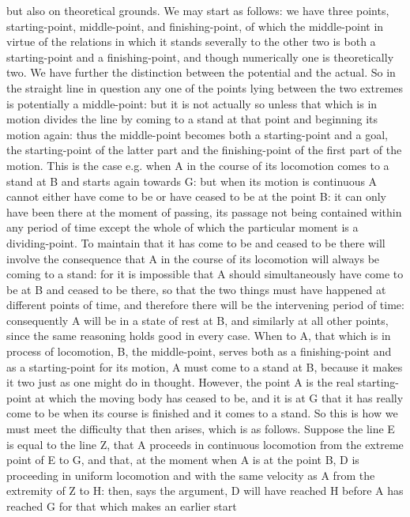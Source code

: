 but also on theoretical grounds. We may start as follows: we have
three points, starting-point, middle-point, and finishing-point, of
which the middle-point in virtue of the relations in which it stands
severally to the other two is both a starting-point and a finishing-point,
and though numerically one is theoretically two. We have further the
distinction between the potential and the actual. So in the straight
line in question any one of the points lying between the two extremes
is potentially a middle-point: but it is not actually so unless that
which is in motion divides the line by coming to a stand at that point
and beginning its motion again: thus the middle-point becomes both
a starting-point and a goal, the starting-point of the latter part
and the finishing-point of the first part of the motion. This is the
case e.g. when A in the course of its locomotion comes to a stand
at B and starts again towards G: but when its motion is continuous
A cannot either have come to be or have ceased to be at the point
B: it can only have been there at the moment of passing, its passage
not being contained within any period of time except the whole of
which the particular moment is a dividing-point. To maintain that
it has come to be and ceased to be there will involve the consequence
that A in the course of its locomotion will always be coming to a
stand: for it is impossible that A should simultaneously have come
to be at B and ceased to be there, so that the two things must have
happened at different points of time, and therefore there will be
the intervening period of time: consequently A will be in a state
of rest at B, and similarly at all other points, since the same reasoning
holds good in every case. When to A, that which is in process of locomotion,
B, the middle-point, serves both as a finishing-point and as a starting-point
for its motion, A must come to a stand at B, because it makes it two
just as one might do in thought. However, the point A is the real
starting-point at which the moving body has ceased to be, and it is
at G that it has really come to be when its course is finished and
it comes to a stand. So this is how we must meet the difficulty that
then arises, which is as follows. Suppose the line E is equal to the
line Z, that A proceeds in continuous locomotion from the extreme
point of E to G, and that, at the moment when A is at the point B,
D is proceeding in uniform locomotion and with the same velocity as
A from the extremity of Z to H: then, says the argument, D will have
reached H before A has reached G for that which makes an earlier start
